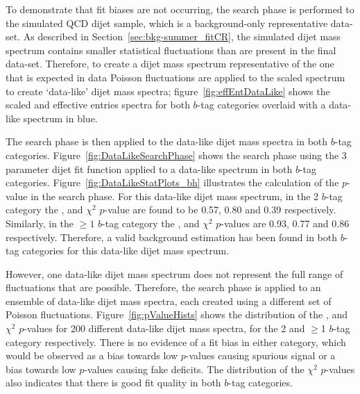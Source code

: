 To demonstrate that fit biases are not occurring,
the search phase is performed to the simulated QCD dijet sample,
which is a background-only representative data-set. 
As described in Section~\ref{sec:bkg-summer_fitCR},
the simulated dijet mass spectrum contains smaller statistical fluctuations than are present in the final data-set.
Therefore, to create a dijet mass spectrum representative of the one that is expected in data 
Poisson fluctuations are applied to the scaled spectrum to create `data-like' dijet mass spectra;
figure~\ref{fig:effEntDataLike} shows the scaled and effective entries spectra for both
$b$-tag categories overlaid with a data-like spectrum in blue.

The search phase is then applied to the data-like dijet mass spectra
in both $b$-tag categories.
Figure~\ref{fig:DataLikeSearchPhase} shows the search phase 
using the 3 parameter dijet fit function
applied to a  data-like spectrum in both $b$-tag categories.
Figure~\ref{fig:DataLikeStatPlots_bh} illustrates the calculation of the \bh{} $p$-value in the search phase.
For this data-like dijet mass spectrum, in the 2 $b$-tag category
the \bh{}, \dhunt{} and  $\chi^{2}$ \mbox{$p$-value} are found to be
0.57, 0.80 and 0.39 respectively.
Similarly, in the $\geq1$ $b$-tag category the
\bh{}, \dhunt{} and  $\chi^{2}$ \mbox{$p$-value}s are
0.93, 0.77 and 0.86 respectively.
Therefore, a valid background estimation has been found in both $b$-tag categories for this data-like dijet mass spectrum.

However, one data-like dijet mass spectrum does not represent the full range of fluctuations that are possible.
Therefore, the search phase is applied to an ensemble of data-like dijet mass spectra,
each created using a different set of Poisson fluctuations.
Figure~\ref{fig:pValueHists}  shows the distribution of
the \bh{}, \dhunt{} and $\chi^{2}$ \mbox{$p$-value}s for 200 different data-like dijet mass spectra,
for the 2 and $\geq$1 $b$-tag category respectively.
There is no evidence of a fit bias in either category,
which would be observed as a bias towards low \bh{} \mbox{$p$-value}s causing spurious signal
or a bias towards low \dhunt{} \mbox{$p$-value}s causing fake deficits.
The distribution of the $\chi^{2}$ \mbox{$p$-value}s also indicates that there is good fit quality in both $b$-tag categories.

